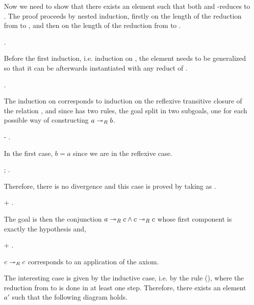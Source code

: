       Now we need to show that there exists an element  such that
      both  and  -reduces to . The proof proceeds by
      nested induction, firstly on the length of the reduction from
       to , and then on the length of the reduction from  to
      . \begin{coqdoccode}
\coqdocemptyline
\coqdocindent{1.00em}
  . \end{coqdoccode}
Before the first induction,
      i.e. induction on , the element  needs to be
      generalized so that it can be afterwards instantiated with any
      reduct of . \begin{coqdoccode}
\coqdocemptyline
\coqdocindent{1.00em}
 . \end{coqdoccode}
The induction on  corresponds to
       induction on the reflexive transitive closure of the relation
       , and since  has two rules, the goal split in two
       subgoals, one for each possible way of constructing $a \twoheadrightarrow_R
       b$. \begin{coqdoccode}
\coqdocemptyline
\coqdocindent{1.00em}
-   . \end{coqdoccode}
In the first case, $b = a$ since we are in
    the reflexive case. \begin{coqdoccode}
\coqdocemptyline
\coqdocindent{2.00em}
\coqdoctac{\ensuremath{\exists}} ; . \end{coqdoccode}
Therefore, there is no divergence and this case is
      proved by taking  as . \begin{coqdoccode}
\coqdocemptyline
\coqdocindent{2.00em}
+ . \end{coqdoccode}
The goal is then the conjunction $a\twoheadrightarrow_R c
        \land c \twoheadrightarrow_R c$ whose first component is exactly the
        hypothesis  and, \begin{coqdoccode}
\coqdocemptyline
\coqdocindent{2.00em}
+  . \end{coqdoccode}
$c \twoheadrightarrow_R c$ corresponds to an application of
        the  axiom.


        The interesting case is given by the inductive case, i.e. by
        the rule (), where the reduction from  to  is
        done in at least one step. Therefore, there exists an element
        $a'$ such that the following diagram holds.


